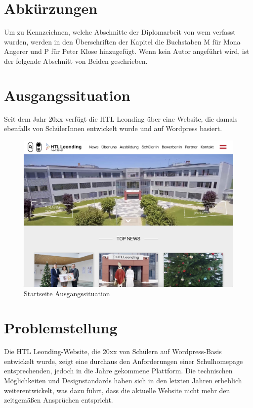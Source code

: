 \section{Abkürzungen}

Um zu Kennzeichnen, welche Abschnitte der Diplomarbeit von wem verfasst wurden,
werden in den Überschriften der Kapitel die Buchstaben M für Mona Angerer und P für Peter Klose
hinzugefügt. Wenn kein Autor angeführt wird, ist der folgende Abschnitt von 
Beiden geschrieben.


\section{Ausgangssituation}

Seit dem Jahr 20xx verfügt die HTL Leonding über eine Website, 
die damals ebenfalls von SchülerInnen entwickelt wurde und auf Wordpress basiert. 

\begin{figure}
    \centering
    \includegraphics[scale=0.3]{pics/startseite_ausgangslage.png}
    \caption{Startseite Ausgangssituation}
    \label{fig:impl:startseite_ausgangslage}
\end{figure}


\section{Problemstellung}

Die HTL Leonding-Website, die 20xx von Schülern auf Wordpress-Basis entwickelt wurde, 
zeigt eine durchaus den Anforderungen einer Schulhomepage entsprechenden, 
jedoch in die Jahre gekommene Plattform. Die technischen Möglichkeiten und Designstandards haben 
sich in den letzten Jahren erheblich weiterentwickelt, was dazu führt, dass die aktuelle 
Website nicht mehr den zeitgemäßen Ansprüchen entspricht. 

